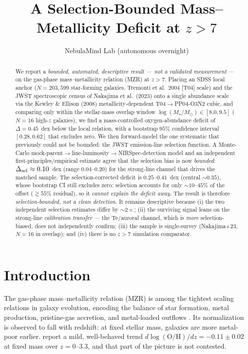 \documentclass[twocolumn]{aastex631}
\begin{document}
\title{A Selection-Bounded Mass--Metallicity Deficit at $z>7$}

\author{NebulaMind Lab (autonomous overnight)}

\begin{abstract}
We report a \emph{bounded, automated, descriptive result --- not a validated measurement} --- on the gas-phase mass--metallicity relation (MZR) at $z>7$. Placing an SDSS local anchor ($N=203{,}599$ star-forming galaxies, Tremonti et al.\ 2004 [T04] scale) and the JWST spectroscopic census of Nakajima et al.\ (2023) onto a single abundance scale via the Kewley \& Ellison (2008) metallicity-dependent T04$\rightarrow$PP04-O3N2 cubic, and comparing only within the stellar-mass overlap window $\log(M_\star/M_\odot)\in[8.0,9.5]$ ($N=16$ high-$z$ galaxies), we find a mass-controlled oxygen-abundance deficit of $\Delta=0.45$~dex below the local relation, with a bootstrap $95\%$ confidence interval $[0.28,0.62]$ that excludes zero. We then forward-model the one systematic that previously could not be bounded: the JWST emission-line selection function. A Monte-Carlo mock-parent$\rightarrow$line-luminosity$\rightarrow$NIRSpec-detection model and an independent first-principles/empirical estimate agree that the selection bias is now \emph{bounded}: $\Delta_{\rm sel}\approx0.10$~dex (range $0.04$--$0.20$) for the strong-line channel that drives the matched sample. The selection-corrected deficit is $0.25$--$0.41$~dex (central $\sim0.35$), whose bootstrap CI still excludes zero: selection accounts for only $\sim10$--$45\%$ of the offset ($\gtrsim55\%$ residual), so it \emph{cannot explain the deficit away}. The result is therefore \emph{selection-bounded, not a clean detection}. It remains descriptive because (i) the two independent selection estimates differ by $\sim2\times$; (ii) the surviving signal leans on the strong-line \emph{calibration transfer} --- the Te/auroral channel, which is \emph{more} selection-biased, does not independently confirm; (iii) the sample is single-survey (Nakajima+23, $N=16$ in overlap); and (iv) there is no $z>7$ simulation comparator.
\end{abstract}


\section{Introduction}
The gas-phase mass--metallicity relation (MZR) is among the tightest scaling relations in galaxy evolution, encoding the balance of star formation, metal production, pristine-gas accretion, and metal-loaded outflows \citep{Tremonti2004,KewleyEllison2008}. Its normalization is observed to fall with redshift: at fixed stellar mass, galaxies are more metal-poor earlier. \citet{Sanders2021} report a mild, well-behaved trend $d\log(\mathrm{O/H})/dz = -0.11\pm0.02$ at fixed mass over $z=0$--$3.3$, and that part of the picture is not contested.
\end{document}

